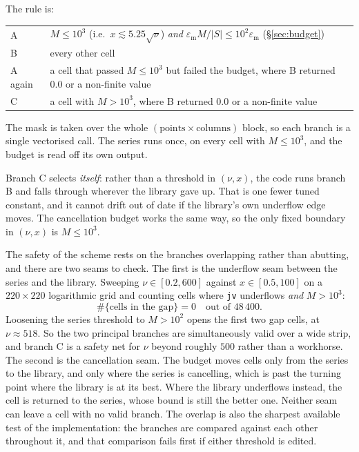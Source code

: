 \documentclass[11pt]{article}
\theoremstyle{remark}
\newcommand{\code}[1]{\texttt{#1}}
\newcommand{\eps}{\varepsilon_{\mathrm{m}}}
\begin{document}
The rule is:
\begin{center}
\begin{tabular}{lp{}}
\toprule
A & $M\le 10^3$ (i.e.\ $x\lesssim 5.25\sqrt{\nu}$) \emph{and} $\eps M/|S|\le10^2\eps$
    (\S\ref{sec:budget})\\
B & every other cell\\
A again & a cell that passed $M\le10^3$ but failed the budget, where B returned $0.0$ or a
    non-finite value\\
C & a cell with $M>10^3$, where B returned $0.0$ or a non-finite value\\
\bottomrule
\end{tabular}
\end{center}
The mask is taken over the whole $(\text{points}\times\text{columns})$ block, so each branch
is a single vectorised call. The series runs once, on every cell with $M\le10^3$, and the
budget is read off its own output.

Branch C selects \emph{itself}: rather than a threshold in $(\nu,x)$, the code runs branch B
and falls through wherever the library gave up. That is one fewer tuned constant, and it
cannot drift out of date if the library's own underflow edge moves. The cancellation budget
works the same way, so the only fixed boundary in $(\nu,x)$ is $M\le10^3$.

The safety of the scheme rests on the branches overlapping rather than abutting, and there are
two seams to check. The first is the underflow seam between the series and the library.
Sweeping $\nu\in[0.2,600]$ against $x\in[0.5,100]$ on a $220\times220$ logarithmic grid and
counting cells where \code{jv} underflows \emph{and} $M>10^3$:
\[
  \#\{\text{cells in the gap}\} = 0 \quad\text{out of } 48\,400 .
\]
Loosening the series threshold to $M>10^2$ opens the first two gap cells, at $\nu\approx518$.
So the two principal branches are simultaneously valid over a wide strip, and branch C is a
safety net for $\nu$ beyond roughly $500$ rather than a workhorse. The second is the
cancellation seam. The budget moves cells only from the series to the library, and only where
the series is cancelling, which is past the turning point where the library is at its best.
Where the library underflows instead, the cell is returned to the series, whose bound is still
the better one. Neither seam can leave a cell with no valid branch. The overlap is also the
sharpest available test of the implementation: the branches are compared against each other
throughout it, and that comparison fails first if either threshold is edited.
\end{document}
